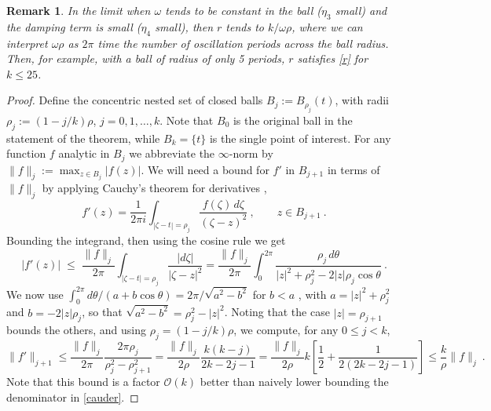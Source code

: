 \documentclass[10pt]{article}
\newcommand{\be}{\begin{equation}}
\newcommand{\ee}{\end{equation}}
\newcommand{\bigO}{{\mathcal O}}
\newtheorem{rmk}[thm]{Remark}
\newcommand{\om}{\omega}
\newcommand{\Fruzsi}[1]{{\color{blue}#1}}
\begin{document}
\begin{rmk}
    In the limit when $\om$ tends to be constant in the ball ($\eta_3$ small) \Fruzsi{and the damping term is small ($\eta_4$ small)},
  then $r$ tends to $k/\om \rho$, where we can interpret $\om\rho$ as $2\pi$
    time the number of oscillation periods across the ball radius.
    Then, for example, with a ball of radius of only \Fruzsi{5 periods}, $r$ satisfies \cref{r}
    for $k\le 25$.
\end{rmk}

\begin{proof}
  Define the concentric nested set of closed balls $B_j := B_{\rho_j}(t)$,
  with radii $\rho_j := (1-j/k)\rho$, $j=0,1,\dots,k$. Note that
  $B_0$ is the original ball in the statement of the theorem, while
  $B_k = \{t\}$ is the single point of interest.
  For any function $f$ analytic in $B_j$ we abbreviate the $\infty$-norm by
  $\|f\|_j := \max_{z \in B_j}|f(z)|$.
  We will need a bound for $f'$ in $B_{j+1}$ in terms of $\|f\|_j$ by
  applying Cauchy's theorem for derivatives
  \cite{steinshakarchi},
  \be
  f'(z) = \frac{1}{2\pi i} \int_{|\zeta-t|=\rho_j} \frac{f(\zeta)\, d\zeta}{(\zeta-z)^2}
  ~, \qquad z \in B_{j+1}~.
  \label{cauder}
  \ee
  Bounding the integrand, then using the cosine rule we get
  $$
  |f'(z)| \;\le \;
  \frac{\|f\|_j}{2\pi} \int_{|\zeta-t| = \rho_j} \frac{|d\zeta|}{|\zeta-z|^2}
  =
  \frac{\|f\|_j}{2\pi} \int_0^{2\pi} \frac{\rho_j\, d\theta}{|z|^2 + \rho_j^2 - 2|z|\rho_j \cos \theta}~.
  $$
  We now use $\int_{0}^{2\pi} d\theta /(a + b \cos \theta) = 2\pi/\sqrt{a^2-b^2}$
  for $b<a$ \cite[Eq.~3.613.1]{GR8}, with
  $a = |z|^2 + \rho_j^2$ and $b = -2|z|\rho_j$, so that
  $\sqrt{a^2-b^2} = \rho_j^2-|z|^2$.
  Noting that the case $|z| = \rho_{j+1}$ bounds the others,
  and using $\rho_j=(1-j/k)\rho$, we compute, for any $0\le j < k$,
  \be
  \|f'\|_{j+1} \le
  \frac{\|f\|_j}{2\pi} \frac{2\pi\rho_j}{\rho_j^2-\rho_{j+1}^2}
  =
  \frac{\|f\|_j}{2 \rho} \frac{k(k-j)}{2k-2j-1}
  =
  \frac{\|f\|_j}{2 \rho} k \left[ \frac{1}{2} + \frac{1}{2(2k-2j-1)}\right]
  \le
  \frac{k}{\rho}\|f\|_j~.
  \label{derbnd}
  \ee
  Note that this bound is a factor $\bigO(k)$ better than naively
  lower bounding the denominator in \cref{cauder}.
  

\end{proof}
\end{document}
